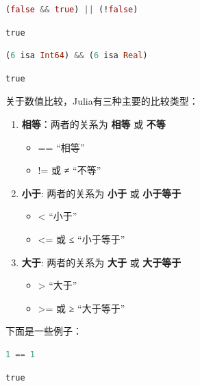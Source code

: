 \documentclass[
  notoc %
]{tufte-book}
\providecommand{\tightlist}{%
  \setlength{\itemsep}{0pt}\setlength{\parskip}{0pt}
}
\begin{document}
\begin{lstlisting}[language=Julia]
(false && true) || (!false)
\end{lstlisting}

\begin{lstlisting}[language=Output]
true
\end{lstlisting}

\begin{lstlisting}[language=Julia]
(6 isa Int64) && (6 isa Real)
\end{lstlisting}

\begin{lstlisting}[language=Output]
true
\end{lstlisting}

关于数值比较，Julia有三种主要的比较类型：

\begin{enumerate}
\def\labelenumi{\arabic{enumi}.}
\tightlist
\item
  \textbf{相等}：两者的关系为 \textbf{相等} 或 \textbf{不等}

  \begin{itemize}
  \tightlist
  \item
    == ``相等''
  \item
    != 或 ≠ ``不等''
  \end{itemize}
\item
  \textbf{小于}: 两者的关系为 \textbf{小于} 或 \textbf{小于等于}

  \begin{itemize}
  \tightlist
  \item
    \textless{} ``小于''
  \item
    \textless= 或 ≤ ``小于等于''
  \end{itemize}
\item
  \textbf{大于}: 两者的关系为 \textbf{大于} 或 \textbf{大于等于}

  \begin{itemize}
  \tightlist
  \item
    \textgreater{} ``大于''
  \item
    \textgreater= 或 ≥ ``大于等于''
  \end{itemize}
\end{enumerate}

下面是一些例子：

\begin{lstlisting}[language=Julia]
1 == 1
\end{lstlisting}

\begin{lstlisting}[language=Output]
true
\end{lstlisting}
\end{document}
